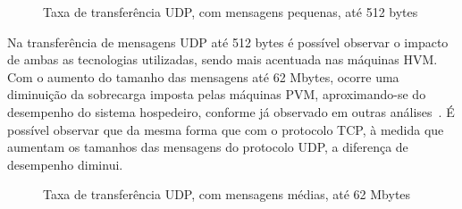 \documentclass[times, 10pt,twocolumn]{article}
\begin{document}
\begin{figure}[!htb]
\centering
{}
\caption{Taxa de transferência UDP, com mensagens pequenas, até 512 bytes}
\label{fig:udpp}
\end{figure}

Na transferência de mensagens UDP até 512 bytes é possível observar o impacto de ambas
as tecnologias utilizadas, sendo mais acentuada nas máquinas HVM. Com o 
aumento do tamanho das mensagens até 62 Mbytes, ocorre uma diminuição da 
sobrecarga imposta pelas máquinas PVM, aproximando-se do desempenho do sistema 
hospedeiro, conforme já observado em outras análises~\cite{urschei07,errc2007}. 
É possível observar que da mesma forma que com o protocolo TCP, à medida que aumentam 
os tamanhos das mensagens do protocolo UDP, a diferença de desempenho diminui.

\begin{figure}[!htb]
\centering
{}
\caption{Taxa de transferência UDP, com mensagens médias, até 62 Mbytes}
\label{fig:udpm}
\end{figure}
\end{document}
